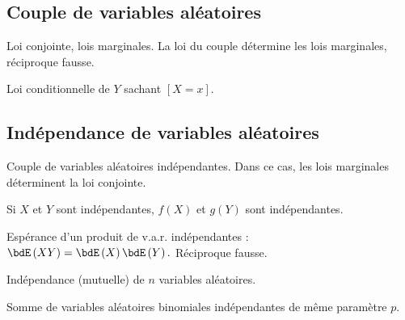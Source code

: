 \documentclass[a4paper,french,bookmarks]{article}
\begin{document}
    \subsection*{Couple de variables aléatoires}
    
    \begin{enumerate}
        \ithand Loi conjointe, lois marginales. La loi du couple détermine les lois
        marginales, réciproque fausse.
        
        \ithand Loi conditionnelle de $Y$ sachant $\left[X = x\right]$.

    \end{enumerate}
    
    \subsection*{Indépendance de variables aléatoires}
    
    \begin{enumerate}
        \ithand Couple de variables aléatoires indépendantes. Dans ce cas, 
        les lois marginales déterminent la loi conjointe.
        
        \ithand Si $X$ et $Y$ sont indépendantes, $f\left(X\right)$ et $g\left(Y\right)$ 
        sont indépendantes.
        
        \ithand Espérance d'un produit de v.a.r. indépendantes : 
        $\bdE\left(XY\right) = \bdE\left(X\right)\bdE\left(Y\right).$ Réciproque fausse.
        
        \ithand Indépendance (mutuelle) de $n$ variables aléatoires.
        
        \ithand Somme de variables aléatoires binomiales indépendantes de même paramètre $p$.
    \end{enumerate}
    
    \questionsdecours
    
\end{document}
